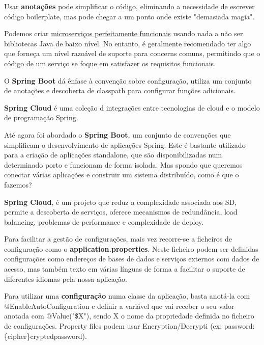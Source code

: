 \documentclass{article}
\begin{document}
Usar \textbf{anotações} pode simplificar o código, eliminando
a necessidade de escrever código boilerplate, mas pode chegar a um
ponto onde existe "demasiada magia".

Podemos criar \uline{microserviços perfeitamente funcionais}
usando nada a não ser bibliotecas Java de baixo nível.
No entanto, é geralmente recomendado ter algo que forneça
um nível razoável de suporte para concerns comuns, permitindo
que o código de um serviço se foque em satisfazer os requisitos
funcionais.

\vspace{2mm}

O \textbf{Spring Boot} dá ênfase à convenção sobre configuração,
utiliza um conjunto de anotações e descoberta de classpath
para configurar funções adicionais.

\vspace{2mm}

\textbf{Spring Cloud} é uma coleção d integrações entre
tecnologias de cloud e o modelo de programação Spring.

\vspace{2mm}

Até agora foi abordado o \textbf{Spring Boot}, um conjunto de convenções que simplificam o
desenvolvimento de aplicações Spring. Este é bastante utilizado para a criação de aplicações
standalone, que são disponibilizadas num determinado porto e funcionam de forma isolada.
Mas spondo que queremos conectar várias aplicações e construir um sistema
distribuído, como é que o fazemos?

\textbf{Spring Cloud}, é um projeto que reduz a complexidade associada aos SD, permite a descoberta de serviços, oferece
mecanismos de redundância, load balancing, problemas de performance e complexidade de
deploy.

\vspace{2mm}

Para facilitar a gestão de configurações, mais vez recorre-se a ficheiros de configuração como o
\textbf{application.properties}. Neste ficheiro podem ser definidas configurações como endereços de bases de dados
e serviços externos com dados de acesso, mas também texto em várias línguas de forma a facilitar o suporte
de diferentes idiomas pela nossa aplicação.

\vspace{2mm}

Para utilizar uma \textbf{configuração} numa classe da aplicação, basta anotá-la com @EnableAutoConfiguration e
definir a variável que vai receber o seu valor anotada com @Value("\${X}"), sendo X o nome da propriedade
definida no ficheiro de configurações. Property files podem usar Encryption/Decrypti
(ex: password: \{cipher\}cryptedpassword).
\end{document}

